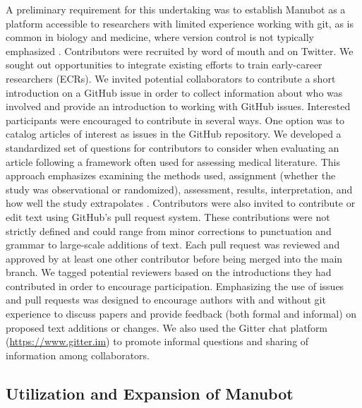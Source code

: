 \documentclass[sigconf]{acmart}
\begin{document}
A preliminary requirement for this undertaking was to establish Manubot as a platform accessible to researchers with limited experience working with git, as is common in biology and medicine, where version control is not typically emphasized \citep{1HmO21gZN, OO1DuZd, 4ny1onB0}.
Contributors were recruited by word of mouth and on Twitter.
We sought out opportunities to integrate existing efforts to train early-career researchers (ECRs).
We invited potential collaborators to contribute a short introduction on a GitHub issue in order to collect information about who was involved and provide an introduction to working with GitHub issues.
Interested participants were encouraged to contribute in several ways.
One option was to catalog articles of interest as issues in the GitHub repository.
We developed a standardized set of questions for contributors to consider when evaluating an article following a framework often used for assessing medical literature.
This approach emphasizes examining the methods used, assignment (whether the study was observational or randomized), assessment, results, interpretation, and how well the study extrapolates \citep{17OQtAY4l}.
Contributors were also invited to contribute or edit text using GitHub's pull request system.
These contributions were not strictly defined and could range from minor corrections to punctuation and grammar to large-scale additions of text.
Each pull request was reviewed and approved by at least one other contributor before being merged into the main branch.
We tagged potential reviewers based on the introductions they had contributed in order to encourage participation.
Emphasizing the use of issues and pull requests was designed to encourage authors with and without git experience to discuss papers and provide feedback (both formal and informal) on proposed text additions or changes.
We also used the Gitter chat platform (\url{https://www.gitter.im}) to promote informal questions and sharing of information among collaborators.

\hypertarget{utilization-and-expansion-of-manubot}{%
\subsection{Utilization and Expansion of Manubot}\label{utilization-and-expansion-of-manubot}}
\end{document}
